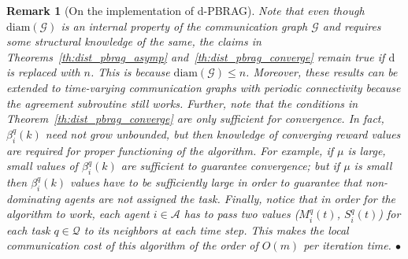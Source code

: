 \documentclass{IEEEtran}
\newcommand{\Mcal}[1]{\mathcal{#1}}
\newcommand{\Mc}[1]{\mathcal{#1}}
\newtheorem{remark}[theorem]{Remark}
\newcommand{\bulletsym}{\hbox{$\bullet$}}
\newcommand{\bulletend}{\relax\ifmmode\else\unskip\hfill\fi\bulletsym}
\newcommand{\margin}[1]{\marginpar{\color{magenta}\tiny\ttfamily#1}}
\def \agt{\Mcal{A}}
\def \diam{\mathrm{diam}}
\def \dg{\mathrm{d}}
\def \grph{\Mcal{G}}
\def \tsk{\Mc{Q}}
\def \dynacr{PBRAG}
\begin{document}
\begin{remark}[On the implementation of d-\dynacr]
  \label{rem:dpbrag_implementation} {\rm Note that even though
    $\diam(\grph)$ is an internal property of the communication graph
    $\grph$ and requires some structural knowledge of the same, the
    claims in Theorems~\ref{th:dist_pbrag_asymp}
    and~\ref{th:dist_pbrag_converge} remain true if $\dg$ is replaced
    with $n$. This is because $\diam(\grph) \leq n$. Moreover, these
    results can be extended to time-varying communication graphs with
    periodic connectivity because the agreement subroutine still works.
    Further, note that the conditions in
    Theorem~\ref{th:dist_pbrag_converge} are only sufficient for
    convergence. In fact, $\beta^q_i(k)$ need not grow unbounded, but
    then knowledge of converging reward values are required for proper
    functioning of the algorithm. For example, if $\mu$ is large, small
    values of $\beta^q_i(k)$ are sufficient to guarantee convergence;
    but if $\mu$ is small then $\beta^q_i(k)$ values have to be
    sufficiently large in order to guarantee that non-dominating
    agents are not assigned the task. Finally, notice that in order
    for the algorithm to work, each agent $i \in \agt$ has to pass
    two values ($M^q_i(t)$, $S^q_i(t)$) for each task $q \in \tsk$ to
    its neighbors at each time step. This makes the local
    communication cost of this algorithm of the order of $O(m)$ per
    iteration time.}  \bulletend
\end{remark}
\end{document}
